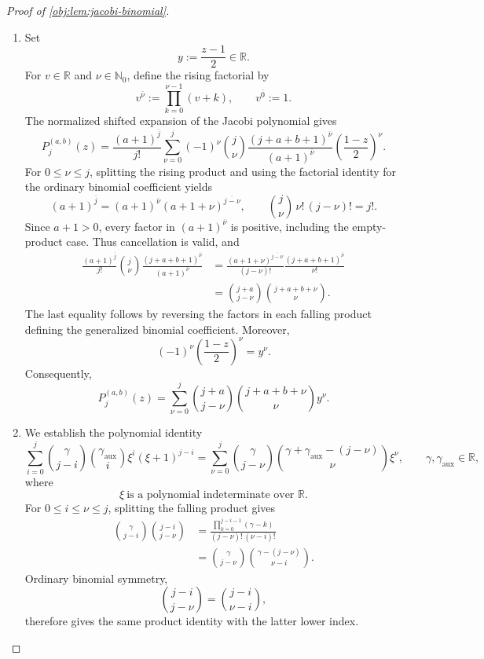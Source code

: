 \begin{proof}[Proof of \cref{obj:lem:jacobi-binomial}]
\begin{enumerate}
\item Set
\[
y:=\frac{z-1}{2}\in\mathbb R.
\]
For \(v\in\mathbb R\) and \(\nu\in\mathbb N_0\), define the rising factorial by
\[
v^{\overline{\nu}}:=\prod_{k=0}^{\nu-1}(v+k),
\qquad v^{\overline{0}}:=1.
\]
The normalized shifted expansion of the Jacobi polynomial gives
\[
P_j^{(a,b)}(z)
=
\frac{(a+1)^{\overline j}}{j!}
\sum_{\nu=0}^{j}
(-1)^\nu\binom j\nu
\frac{(j+a+b+1)^{\overline\nu}}
     {(a+1)^{\overline\nu}}
\left(\frac{1-z}{2}\right)^\nu.
\]
For \(0\le \nu\le j\), splitting the rising product and using the factorial identity for the ordinary binomial coefficient yields
\[
(a+1)^{\overline j}
=(a+1)^{\overline\nu}
 (a+1+\nu)^{\overline{j-\nu}},
\qquad
\binom j\nu\,\nu!\,(j-\nu)!=j!.
\]
Since \(a+1>0\), every factor in \((a+1)^{\overline\nu}\) is positive, including the empty-product case. Thus cancellation is valid, and
\[
\begin{aligned}
\frac{(a+1)^{\overline j}}{j!}\binom j\nu
\frac{(j+a+b+1)^{\overline\nu}}
     {(a+1)^{\overline\nu}}
&=
\frac{(a+1+\nu)^{\overline{j-\nu}}}{(j-\nu)!}
\frac{(j+a+b+1)^{\overline\nu}}{\nu!}\\
&=\binom{j+a}{j-\nu}\binom{j+a+b+\nu}{\nu}.
\end{aligned}
\]
The last equality follows by reversing the factors in each falling product defining the generalized binomial coefficient. Moreover,
\[
(-1)^\nu\left(\frac{1-z}{2}\right)^\nu=y^\nu.
\]
Consequently,
\[
P_j^{(a,b)}(z)
=\sum_{\nu=0}^{j}
\binom{j+a}{j-\nu}\binom{j+a+b+\nu}{\nu}y^\nu.
\]

\item We establish the polynomial identity
\[
\sum_{i=0}^{j}
\binom{\gamma}{j-i}\binom{\gamma_{\mathrm{aux}}}{i}
\xi^i(\xi+1)^{j-i}
=
\sum_{\nu=0}^{j}
\binom{\gamma}{j-\nu}
\binom{\gamma+\gamma_{\mathrm{aux}}-(j-\nu)}{\nu}\xi^\nu,
\qquad
\gamma,\gamma_{\mathrm{aux}}\in\mathbb R,
\]
where
\[
\xi\ \text{is a polynomial indeterminate over }\mathbb R.
\]
For \(0\le i\le\nu\le j\), splitting the falling product gives
\[
\begin{aligned}
\binom{\gamma}{j-i}\binom{j-i}{j-\nu}
&=
\frac{\prod_{k=0}^{j-i-1}(\gamma-k)}
     {(j-\nu)!\,(\nu-i)!}\\
&=
\binom{\gamma}{j-\nu}
\binom{\gamma-(j-\nu)}{\nu-i}.
\end{aligned}
\]
Ordinary binomial symmetry,
\[
\binom{j-i}{j-\nu}=\binom{j-i}{\nu-i},
\]
therefore gives the same product identity with the latter lower index.


\end{enumerate}
\end{proof}
